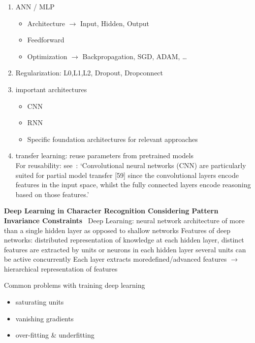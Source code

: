 \begin{enumerate}
    \item ANN / MLP %
        \begin{itemize}
            \item Architecture $\rightarrow$ Input, Hidden, Output
            \item Feedforward
            \item Optimization $\rightarrow$ Backpropagation, SGD, ADAM, \ldots
        \end{itemize}
    \item Regularization: L0,L1,L2, Dropout, Dropconnect
    \item important architectures
        \begin{itemize}
            \item CNN %
            \item RNN %
            \item Specific foundation architectures for relevant approaches
        \end{itemize}
    \item transfer learning: reuse parameters from pretrained models\\


For reusability: see~\citep{ashmore_assuring_2021}: `Convolutional neural networks (CNN) are
particularly suited for partial model transfer [59] since the convolutional layers encode
features in the input space, whilst the fully connected layers encode reasoning based on those
features.'


\end{enumerate}

\textbf{Deep Learning in Character Recognition Considering Pattern Invariance
Constraints}~\citep{oyedotun_deep_2015}
Deep Learning: neural network architecture of more than a single hidden layer as opposed to shallow networks
Features of deep networks: distributed representation of knowledge at each hidden layer, distinct
features are extracted by units or neurons in each hidden layer
several units can be active concurrently
Each layer extracts moredefined/advanced features $\rightarrow$ hierarchical representation of
features

Common problems with training deep learning
\begin{itemize}
    \item saturating units
    \item vanishing gradients
    \item over-fitting \& underfitting
\end{itemize}


